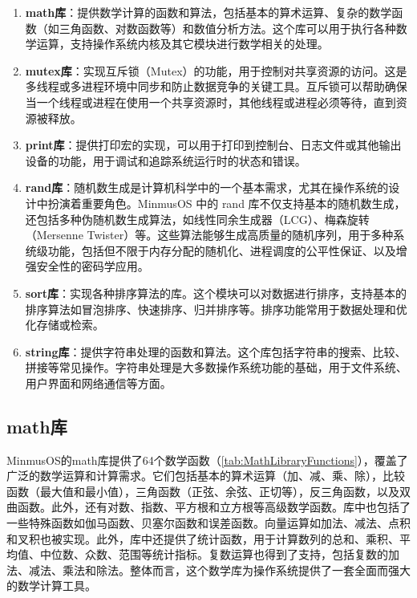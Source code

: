 \begin{enumerate}
    \item \textbf{math库}：提供数学计算的函数和算法，包括基本的算术运算、复杂的数学函数（如三角函数、对数函数等）和数值分析方法。这个库可以用于执行各种数学运算，支持操作系统内核及其它模块进行数学相关的处理。
    \item \textbf{mutex库}：实现互斥锁（Mutex）的功能，用于控制对共享资源的访问。这是多线程或多进程环境中同步和防止数据竞争的关键工具。互斥锁可以帮助确保当一个线程或进程在使用一个共享资源时，其他线程或进程必须等待，直到资源被释放。
    \item \textbf{print库}：提供打印宏的实现，可以用于打印到控制台、日志文件或其他输出设备的功能，用于调试和追踪系统运行时的状态和错误。
    \item \textbf{rand库}：随机数生成是计算机科学中的一个基本需求，尤其在操作系统的设计中扮演着重要角色。MinmusOS 中的 rand 库不仅支持基本的随机数生成，还包括多种伪随机数生成算法，如线性同余生成器（LCG）、梅森旋转（Mersenne Twister）等。这些算法能够生成高质量的随机序列，用于多种系统级功能，包括但不限于内存分配的随机化、进程调度的公平性保证、以及增强安全性的密码学应用。
    \item \textbf{sort库}：实现各种排序算法的库。这个模块可以对数据进行排序，支持基本的排序算法如冒泡排序、快速排序、归并排序等。排序功能常用于数据处理和优化存储或检索。
    \item \textbf{string库}：提供字符串处理的函数和算法。这个库包括字符串的搜索、比较、拼接等常见操作。字符串处理是大多数操作系统功能的基础，用于文件系统、用户界面和网络通信等方面。
\end{enumerate}

\subsection{math库}

MinmusOS的math库提供了64个数学函数（\cref{tab:MathLibraryFunctions}），覆盖了广泛的数学运算和计算需求。它们包括基本的算术运算（加、减、乘、除），比较函数（最大值和最小值），三角函数（正弦、余弦、正切等），反三角函数，以及双曲函数。此外，还有对数、指数、平方根和立方根等高级数学函数。库中也包括了一些特殊函数如伽马函数、贝塞尔函数和误差函数。向量运算如加法、减法、点积和叉积也被实现。此外，库中还提供了统计函数，用于计算数列的总和、乘积、平均值、中位数、众数、范围等统计指标。复数运算也得到了支持，包括复数的加法、减法、乘法和除法。整体而言，这个数学库为操作系统提供了一套全面而强大的数学计算工具。

